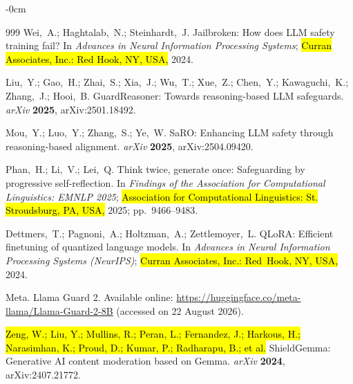 \documentclass[superintelligence,article,accept,moreauthors]{Definitions/mdpi}
\begin{document}
\begin{adjustwidth}{-\extralength}{0cm}
{\begin{thebibliography}{999}
Wei,~A.; Haghtalab,~N.; Steinhardt,~J.
Jailbroken: How does {LLM} safety training fail?
In {\em Advances in Neural Information Processing Systems}; \hl{Curran Associates, Inc.: Red Hook, NY, USA,} %
  2024.

Liu,~Y.; Gao,~H.; Zhai,~S.; Xia,~J.; Wu,~T.; Xue,~Z.; Chen,~Y.; Kawaguchi,~K.; Zhang,~J.; Hooi,~B.
{GuardReasoner}: Towards reasoning-based {LLM} safeguards.
{\em arXiv} {\bf 2025}, arXiv:2501.18492.

Mou,~Y.; Luo,~Y.; Zhang,~S.; Ye,~W.
{SaRO}: Enhancing {LLM} safety through reasoning-based alignment.
{\em arXiv} {\bf 2025}, arXiv:2504.09420.

Phan,~H.; Li,~V.; Lei,~Q.
Think twice, generate once: Safeguarding by progressive self-reflection.
In {\em Findings of the Association for Computational Linguistics: EMNLP 2025}; \hl{Association for Computational Linguistics: St. Stroudsburg, PA, USA,} 2025; pp.~9466--9483.

Dettmers,~T.; Pagnoni,~A.; Holtzman,~A.; Zettlemoyer,~L.
{QLoRA}: Efficient finetuning of quantized language models.
In {\em Advances in Neural Information Processing Systems (NeurIPS)}; \hl{Curran Associates, Inc.: Red~Hook, NY, USA,} 2024.

Meta. {Llama Guard 2}. Available online: \url{https://huggingface.co/meta-llama/Llama-Guard-2-8B} (accessed on 22 August 2026).



\hl{Zeng, W.; Liu, Y.; Mullins, R.; Peran, L.; Fernandez, J.; Harkous, H.; Narasimhan, K.; Proud, D.; Kumar, P.; Radharapu, B.; et al.} %
{ShieldGemma}: Generative {AI} content moderation based on {Gemma}.
{\em arXiv} {\bf 2024}, arXiv:2407.21772.


\end{thebibliography}}
\end{adjustwidth}
\end{document}
